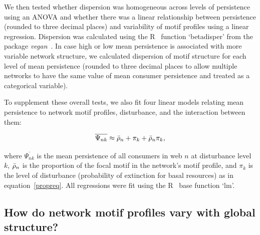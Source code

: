 \documentclass[12pt]{article}
\begin{document}
\begin{spacing}{2.0}
        We then tested whether dispersion was homogeneous across levels of persistence using an ANOVA and whether there was a linear relationship between persistence (rounded to three decimal places) and variability of motif profiles using a linear regression.
        Dispersion was calculated using the R~\citep{R} function `betadisper' from the package \emph{vegan}~\citep{vegan}.
        In case high or low mean persistence is associated with more variable network structure, we calculated dispersion of motif structure for each level of mean persistence (rounded to three decimal places to allow multiple networks to have the same value of mean consumer persistence and treated as a categorical variable). 

        
        To supplement these overall tests, we also fit four linear models relating mean persistence to network motif profiles, disturbance, and the interaction between them:

            \begin{equation}
                \overline{\Psi_{nk}} \approx \Bar{\rho}_{n} + \pi_{k} + \Bar{\rho}_{n}\pi_{k} ,
                \label{netpropeq}
            \end{equation}
        
        \noindent where $\overline{\Psi_{nk}}$ is the mean persistence of all consumers in web $n$ at disturbance level $k$, $\Bar{\rho}_{n}$ is the proportion of the focal motif in the network's motif profile, and $\pi_k$ is the level of disturbance (probability of extinction for basal resources) as in equation~\ref{propreq}. 
        All regressions were fit using the R~\citep{R} base function `lm'.
    

    \subsection{How do network motif profiles vary with global structure?}
    

\end{spacing}
\end{document}
